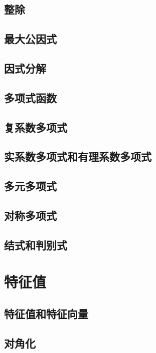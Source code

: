 \documentclass[UTF8,12pt,a4paper,fontset=fandol]{ctexbook}
\begin{document}
\section{整除}

\section{最大公因式}

\section{因式分解}

\section{多项式函数}

\section{复系数多项式}

\section{实系数多项式和有理系数多项式}

\section{多元多项式}

\section{对称多项式}

\section{结式和判别式}


\chapter{特征值}

\section{特征值和特征向量}

\section{对角化}
\end{document}
